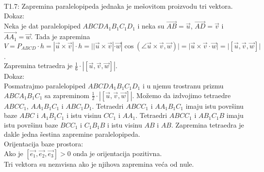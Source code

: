 \documentclass[12pt]{article}
\begin{document}
    T1.7: Zapremina paralelopipeda jednaka je mešovitom proizvodu tri vektora.\\
    Dokaz:\\
    Neka je dat paralelopiped $ABCDA_1B_1C_1D_1$ i neka su $\overrightarrow{AB}=\overrightarrow{u}$, $\overrightarrow{AD}=\overrightarrow{v}$ i $\overrightarrow{AA_1}=\overrightarrow{w}$.
    Tada je zapremina $V=P_{ABCD}\cdot h=|\overrightarrow{u}\times\overrightarrow{v}|\cdot h=||\overrightarrow{u}\times\overrightarrow{v}|\cdot \overrightarrow{w}|\cos(\angle \overrightarrow{u}\times\overrightarrow{v},\overrightarrow{w})|=|\overrightarrow{u}\times\overrightarrow{v}\cdot \overrightarrow{w}|=|[\overrightarrow{u},\overrightarrow{v},\overrightarrow{w}]|$.\\
    Zapremina tetraedra je $\frac{1}{6}\cdot |[\overrightarrow{u},\overrightarrow{v},\overrightarrow{w}]|$.\\
    Dokaz:\\
    Posmatrajmo paralelopiped $ABCDA_1B_1C_1D_1$ i u njemu trostranu prizmu $ABCA_1B_1C_1$ sa zapreminom
$\frac{1}{2}\cdot|[\overrightarrow{u},\overrightarrow{v},\overrightarrow{w}]|$. Možemo da izdvojimo tetraedre $ABCC_1$, $AA_1B_1C_1$ i $ABC_1D_1$.
    Tetraedri $ABCC_1$ i $AA_1B_1C_1$ imaju istu površinu baze $ABC$ i $A_1B_1C_1$ i istu visinu $CC_1$ i $AA_1$.
    Tetraedri $ABCC_1$ i $AB_1C_1B$ imaju istu površinu baze $BCC_1$ i $C_1B_1B$ i istu visinu $AB$ i $AB$.
    Zapremina tetraedra je dakle jedna šestina zapremine paralelopipeda.\\
    Orijentacija baze prostora:\\
    Ako je $[\overrightarrow{e_1},\overrightarrow{e_2},\overrightarrow{e_3}]>0$ onda je orijentacija pozitivna.\\
    Tri vektora su nezavisna ako je njihova zapremina veća od nule.
    \par
\end{document}
